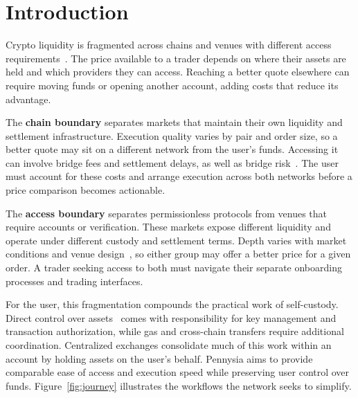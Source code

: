 \section{Introduction}\label{sec:introduction}

Crypto liquidity is fragmented across chains and venues with different access requirements~\cite{sok-defi}. The price available to a trader depends on where their assets are held and which providers they can access. Reaching a better quote elsewhere can require moving funds or opening another account, adding costs that reduce its advantage.

The \textbf{chain boundary} separates markets that maintain their own liquidity and settlement infrastructure. Execution quality varies by pair and order size, so a better quote may sit on a different network from the user's funds. Accessing it can involve bridge fees and settlement delays, as well as bridge risk~\cite{bridges}. The user must account for these costs and arrange execution across both networks before a price comparison becomes actionable.

The \textbf{access boundary} separates permissionless protocols from venues that require accounts or verification. These markets expose different liquidity and operate under different custody and settlement terms. Depth varies with market conditions and venue design~\cite{dexdepth}, so either group may offer a better price for a given order. A trader seeking access to both must navigate their separate onboarding processes and trading interfaces.

For the user, this fragmentation compounds the practical work of self-custody. Direct control over assets~\cite{bitcoin} comes with responsibility for key management and transaction authorization, while gas and cross-chain transfers require additional coordination. Centralized exchanges consolidate much of this work within an account by holding assets on the user's behalf. Pennysia aims to provide comparable ease of access and execution speed while preserving user control over funds. Figure~\ref{fig:journey} illustrates the workflows the network seeks to simplify.

